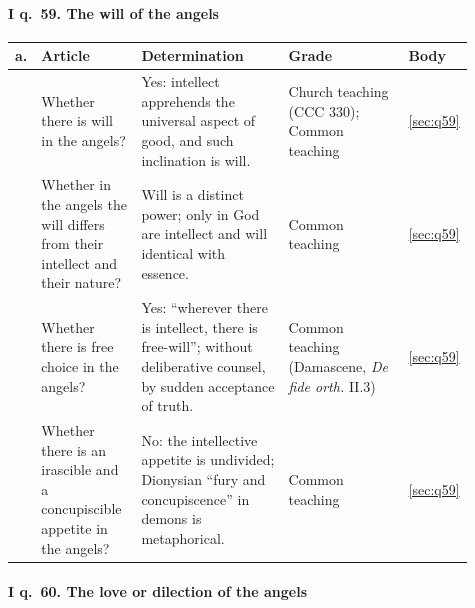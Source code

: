 \paragraph{I q.~59. The will of the angels}

\begingroup\footnotesize
\begin{longtable}{>{\raggedright\arraybackslash}p{0.03\linewidth}>{\raggedright\arraybackslash}p{0.22\linewidth}>{\raggedright\arraybackslash}p{0.33\linewidth}>{\raggedright\arraybackslash}p{0.27\linewidth}>{\raggedright\arraybackslash}p{0.06\linewidth}}
\toprule
\textbf{a.} & \textbf{Article} & \textbf{Determination} & \textbf{Grade} & \textbf{Body}\\
\midrule
\endhead
1 & Whether there is will in the angels? & Yes: intellect apprehends the universal aspect of good, and such inclination is will. & Church teaching (CCC 330); Common teaching & \ref{sec:q59}\\
2 & Whether in the angels the will differs from their intellect and their nature? & Will is a distinct power; only in God are intellect and will identical with essence. & Common teaching & \ref{sec:q59}\\
3 & Whether there is free choice in the angels? & Yes: ``wherever there is intellect, there is free-will''; without deliberative counsel, by sudden acceptance of truth. & Common teaching (Damascene, \emph{De fide orth.} II.3) & \ref{sec:q59}\\
4 & Whether there is an irascible and a concupiscible appetite in the angels? & No: the intellective appetite is undivided; Dionysian ``fury and concupiscence'' in demons is metaphorical. & Common teaching & \ref{sec:q59}\\
\bottomrule
\end{longtable}
\endgroup

\paragraph{I q.~60. The love or dilection of the angels}

